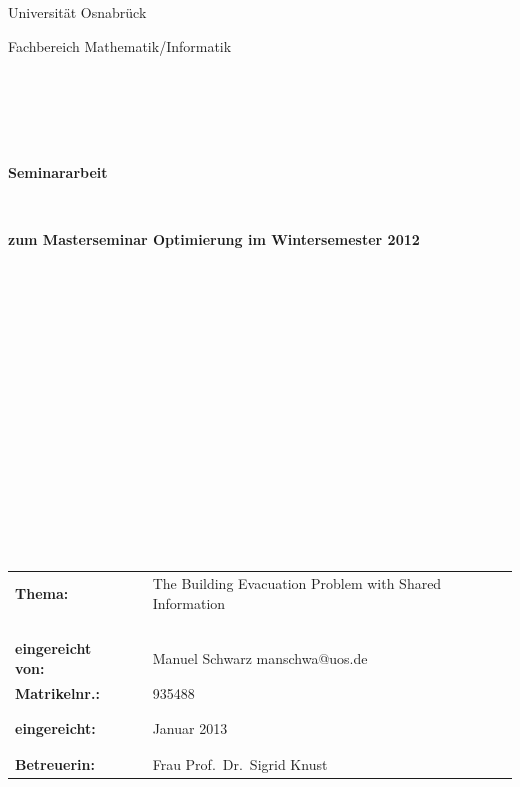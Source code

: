 \documentclass[a4paper, 11pt]{scrreprt}
\begin{document}
\thispagestyle{empty}
\begin{center}
\Large{Universität Osnabrück}\\
\end{center}


\begin{center}
\Large{Fachbereich Mathematik/Informatik}
\end{center}
\begin{verbatim}





\end{verbatim}
\begin{center}
\textbf{\LARGE{Seminararbeit}}
\end{center}
\begin{verbatim}


\end{verbatim}
\begin{center}
\textbf{zum Masterseminar Optimierung im Wintersemester 2012}
\end{center}
\begin{verbatim}
















\end{verbatim}

\begin{flushleft}
\begin{tabular}{lll}
\textbf{Thema:} & & The Building Evacuation Problem with Shared Information\\
& & \\
& & \\
& & \\
& & \\
\textbf{eingereicht von:} & & Manuel Schwarz \flq{}manschwa@uos.de\frq{}\\
\textbf{Matrikelnr.:} & & 935488\\
& & \\
& & \\
\textbf{eingereicht:} & & Januar 2013\\
& & \\
& & \\
\textbf{Betreuerin:} & & Frau Prof.\ Dr.\ Sigrid Knust
\end{tabular}
\end{flushleft}
\end{document}
